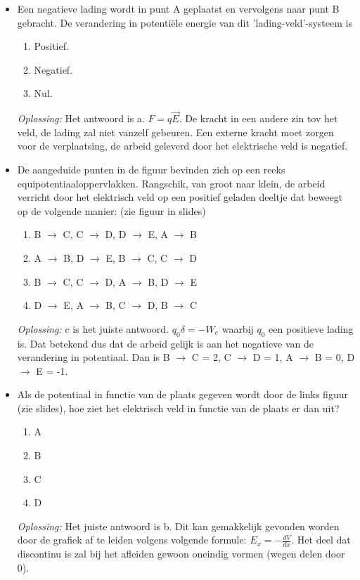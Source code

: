 \documentclass[12pt,a4paper]{article}
\begin{document}
\begin{itemize}
	\item Een negatieve lading wordt in punt A geplaatst en vervolgens naar punt B gebracht. De verandering in potentiële energie van dit 'lading-veld'-systeem is
	\begin{enumerate}[label=\alph*]
		\item Positief.
		\item Negatief.
		\item Nul.
	\end{enumerate}
	\textit{Oplossing:} Het antwoord is a. \(F = q\vec{E}\). De kracht in een andere zin tov het veld, de lading zal niet vanzelf gebeuren. Een externe kracht moet zorgen voor de verplaatsing, de arbeid geleverd door het elektrische veld is negatief.
	\item De aangeduide punten in de figuur bevinden zich op een reeks equipotentiaaloppervlakken. Rangschik, van groot naar klein, de arbeid verricht door het elektrisch veld op een positief geladen deeltje dat beweegt op de volgende manier: (zie figuur in slides)
	\begin{enumerate}[label=\alph*]
		\item B $\rightarrow$ C, C $\rightarrow$ D, D $\rightarrow$ E, A $\rightarrow$ B
		\item A $\rightarrow$ B, D $\rightarrow$ E, B $\rightarrow$ C, C $\rightarrow$ D
		\item B $\rightarrow$ C, C $\rightarrow$ D, A $\rightarrow$ B, D $\rightarrow$ E
		\item D $\rightarrow$ E, A $\rightarrow$ B, C $\rightarrow$ D, B $\rightarrow$ C
	\end{enumerate}
	\textit{Oplossing:} c is het juiste antwoord. \(q_0 \delta = -W_e\) waarbij $q_0$ een positieve lading is. Dat betekend dus dat de arbeid gelijk is aan het negatieve van de verandering in potentiaal. Dan is B $\rightarrow$ C = 2, C $\rightarrow$ D = 1, A $\rightarrow$ B = 0, D $\rightarrow$ E = -1.
	\item Als de potentiaal in functie van de plaats gegeven wordt door de links figuur (zie slides), hoe ziet het elektrisch veld in functie van de plaats er dan uit?
	\begin{enumerate}[label=\alph*]
		\item A
		\item B
		\item C
		\item D
	\end{enumerate}
	\textit{Oplossing:} Het juiste antwoord is b. Dit kan gemakkelijk gevonden worden door de grafiek af te leiden volgens volgende formule: \(E_x = -\frac{dV}{dx}\). Het deel dat discontinu is zal bij het afleiden gewoon oneindig vormen (wegen delen door 0).

\end{itemize}
\end{document}
